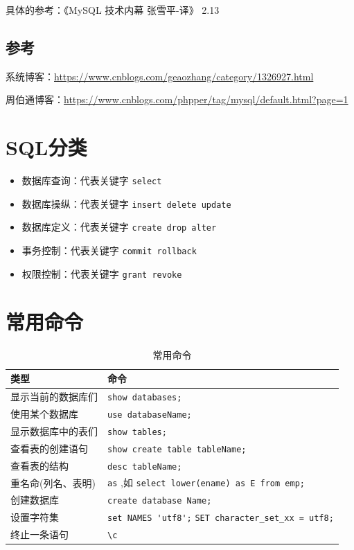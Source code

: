 \documentclass[UTF8,a4paper,12pt]{ctexbook}
\begin{document}
			具体的参考：《MySQL 技术内幕 张雪平-译》 2.13
		\subsection{参考}
		
			系统博客：\url{https://www.cnblogs.com/geaozhang/category/1326927.html}
		
			周伯通博客：\url{https://www.cnblogs.com/phpper/tag/mysql/default.html?page=1}
	

	\section{SQL分类}
		\begin{itemize}
			\item 数据库查询：代表关键字 \verb|select|
			\item 数据库操纵：代表关键字 \verb|insert delete update|
			\item 数据库定义：代表关键字 \verb|create drop alter|
			\item 事务控制：代表关键字 \verb|commit rollback|
			\item 权限控制：代表关键字 \verb|grant revoke|
		\end{itemize} 
	
	\section{常用命令}
		\begin{table}[H]
			\centering
			\caption{常用命令}
			\begin{tabular}{p{4cm}<{\centering}|p{11cm}<{\centering}}
				\hline
					类型  & 命令 \\
				\hline
					显示当前的数据库们  & \verb|show databases;| \\
					使用某个数据库		 & \verb|use databaseName;| \\
					显示数据库中的表们  & \verb|show tables;|	\\
					查看表的创建语句	& \verb|show create table tableName;|	\\
					查看表的结构	& \verb|desc tableName;|	\\
					重名命(列名、表明)	& \verb|as| ,如 \verb|select lower(ename) as E from emp;|	\\
					创建数据库	& \verb|create database Name;|	\\
					设置字符集	& \verb|set NAMES 'utf8';| \verb|SET character_set_xx = utf8;|	\\
					终止一条语句	& \verb|\c|	\\
				\hline
			\end{tabular}
		\end{table}
\end{document}
